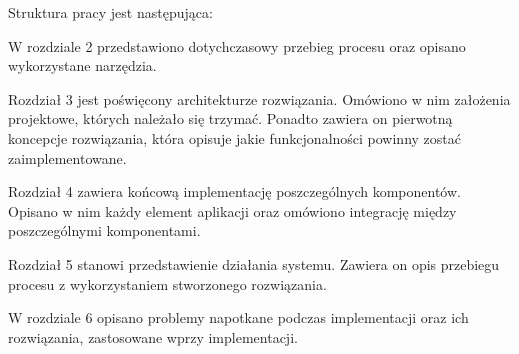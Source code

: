 
\vspace{0.5cm}
Struktura pracy jest następująca:

\noindent W rozdziale 2  przedstawiono dotychczasowy przebieg procesu oraz opisano wykorzystane narzędzia.

\noindent Rozdział 3 jest poświęcony architekturze rozwiązania. Omówiono w nim założenia projektowe, których należało się trzymać. Ponadto zawiera on pierwotną koncepcje rozwiązania, która opisuje jakie funkcjonalności powinny zostać zaimplementowane.

\noindent Rozdział 4 zawiera końcową implementację poszczególnych komponentów. Opisano w nim każdy element aplikacji oraz omówiono integrację między poszczególnymi komponentami.

\noindent Rozdział 5 stanowi przedstawienie działania systemu. Zawiera on opis przebiegu procesu z wykorzystaniem stworzonego rozwiązania.

\noindent W rozdziale 6 opisano problemy napotkane podczas implementacji oraz ich rozwiązania, zastosowane wprzy implementacji.

